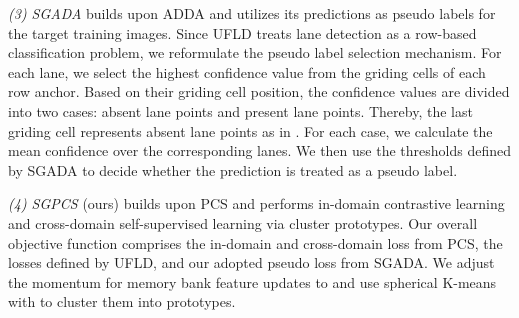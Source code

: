 \documentclass{article}
\begin{document}
	\textit{(3) SGADA} \cite{sgada2021} builds upon ADDA and utilizes its predictions as pseudo labels for the target training images. Since UFLD treats lane detection as a row-based classification problem, we reformulate the pseudo label selection mechanism. For each lane, we select the highest confidence value from the griding cells of each row anchor. Based on their griding cell position, the confidence values are divided into two cases: absent lane points and present lane points. Thereby, the last griding cell represents absent lane points as in \cite{qin2020ultra}. For each case, we calculate the mean confidence over the corresponding lanes. We then use the thresholds defined by SGADA
	to decide whether the prediction is treated as a pseudo label.
	
	\textit{(4) SGPCS} (ours) builds upon PCS \cite{yue2021prototypical} and performs in-domain contrastive learning and cross-domain self-supervised learning via cluster prototypes. Our overall objective function comprises the in-domain and cross-domain loss from PCS, the losses defined by UFLD, and our adopted pseudo loss from SGADA. We adjust the momentum for memory bank feature updates to  and use spherical K-means \cite{johnson2019billion} with  to cluster them into prototypes.
	
\end{document}

